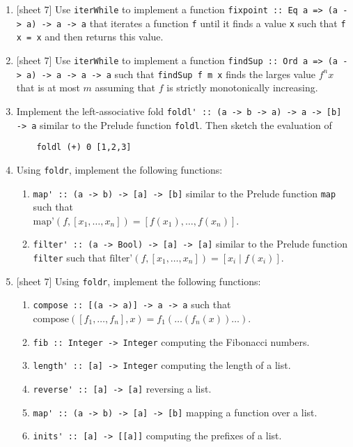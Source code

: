 \documentclass{article}
\begin{document}
\begin{enumerate}
\item {[sheet 7]} Use \verb|iterWhile| to implement a function \verb|fixpoint :: Eq a => (a -> a) -> a -> a| that iterates a function \verb|f| until it finds a value \verb|x| such that \verb|f x = x| and then returns this value.

\item {[sheet 7]} Use \verb|iterWhile| to implement a function \verb|findSup :: Ord a => (a -> a) -> a -> a -> a| such that \verb|findSup f m x| finds the larges value $f^nx$ that is at most $m$ assuming that $f$ is strictly monotonically increasing.

\item Implement the left-associative fold \verb|foldl' :: (a -> b -> a) -> a -> [b] -> a| similar to the Prelude function \verb|foldl|. Then sketch the evaluation of
\begin{verbatim}
    foldl (+) 0 [1,2,3]
\end{verbatim}

\item Using \verb|foldr|, implement the following functions:
\begin{enumerate}
\item \verb|map' :: (a -> b) -> [a] -> [b]| similar to the Prelude function \verb|map| such that \\ $\text{map'}(f, [x_1, \dots, x_n]) = [f(x_1), \dots, f(x_n)]$.
\item \verb|filter' :: (a -> Bool) -> [a] -> [a]| similar to the Prelude function \verb|filter| such that $\text{filter'}(f, [x_1, \dots, x_n]) = [x_i \mid f(x_i)]$.
\end{enumerate}

\item {[sheet 7]} Using \verb|foldr|, implement the following functions:
\begin{enumerate}
\item \verb|compose :: [(a -> a)] -> a -> a| such that $\text{compose}([f_1, \dots, f_n], x) = f_1(\dots(f_n(x))\dots)$.
\item \verb|fib :: Integer -> Integer| computing the Fibonacci numbers.
\item \verb|length' :: [a] -> Integer| computing the length of a list.
\item \verb|reverse' :: [a] -> [a]| reversing a list.
\item \verb|map' :: (a -> b) -> [a] -> [b]| mapping a function over a list.
\item \verb|inits' :: [a] -> [[a]]| computing the prefixes of a list.
\end{enumerate}


\end{enumerate}
\end{document}
